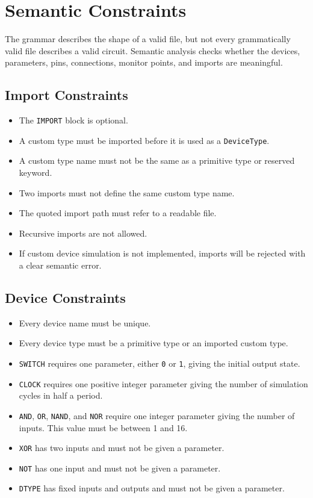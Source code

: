 \documentclass[10pt,a4paper]{article}
\begin{document}
\section{Semantic Constraints}

The grammar describes the shape of a valid file, but not every grammatically
valid file describes a valid circuit. Semantic analysis checks whether the
devices, parameters, pins, connections, monitor points, and imports are
meaningful.

\subsection{Import Constraints}

\begin{itemize}
    \item The \texttt{IMPORT} block is optional.
    \item A custom type must be imported before it is used as a
    \texttt{DeviceType}.
    \item A custom type name must not be the same as a primitive type or
    reserved keyword.
    \item Two imports must not define the same custom type name.
    \item The quoted import path must refer to a readable file.
    \item Recursive imports are not allowed.
    \item If custom device simulation is not implemented, imports will be
    rejected with a clear semantic error.
\end{itemize}

\subsection{Device Constraints}

\begin{itemize}
    \item Every device name must be unique.
    \item Every device type must be a primitive type or an imported custom
    type.
    \item \texttt{SWITCH} requires one parameter, either \texttt{0} or
    \texttt{1}, giving the initial output state.
    \item \texttt{CLOCK} requires one positive integer parameter giving the
    number of simulation cycles in half a period.
    \item \texttt{AND}, \texttt{OR}, \texttt{NAND}, and \texttt{NOR} require
    one integer parameter giving the number of inputs. This value must be
    between 1 and 16.
    \item \texttt{XOR} has two inputs and must not be given a parameter.
    \item \texttt{NOT} has one input and must not be given a parameter.
    \item \texttt{DTYPE} has fixed inputs and outputs and must not be given a
    parameter.
\end{itemize}
\end{document}
